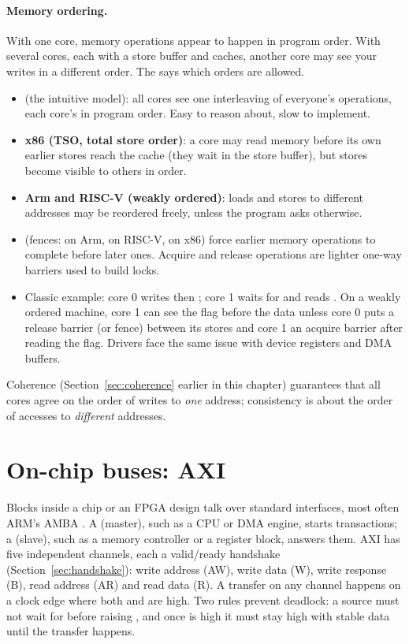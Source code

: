 \paragraph{Memory ordering.} With one core, memory operations appear to happen in program order. With several cores, each with a store buffer and caches, another core may see your writes in a different order. The  says which orders are allowed.
\begin{itemize}
  \item {} (the intuitive model): all cores see one interleaving of everyone's operations, each core's in program order. Easy to reason about, slow to implement.
  \item \textbf{x86 (TSO, total store order)}: a core may read memory before its own earlier stores reach the cache (they wait in the store buffer), but stores become visible to others in order.
  \item \textbf{Arm and RISC-V (weakly ordered)}: loads and stores to different addresses may be reordered freely, unless the program asks otherwise.
  \item {} (fences:  on Arm,  on RISC-V,  on x86) force earlier memory operations to complete before later ones. Acquire and release operations are lighter one-way barriers used to build locks.
  \item Classic example: core 0 writes  then ; core 1 waits for  and reads . On a weakly ordered machine, core 1 can see the flag before the data unless core 0 puts a release barrier (or fence) between its stores and core 1 an acquire barrier after reading the flag. Drivers face the same issue with device registers and DMA buffers.
\end{itemize}

Coherence (Section~\ref{sec:coherence} earlier in this chapter) guarantees that all cores agree on the order of writes to \emph{one} address; consistency is about the order of accesses to \emph{different} addresses.

\section{On-chip buses: AXI}
\label{sec:axi}

Blocks inside a chip or an FPGA design talk over standard interfaces, most often ARM's AMBA . A  (master), such as a CPU or DMA engine, starts transactions; a  (slave), such as a memory controller or a register block, answers them. AXI has five independent channels, each a valid/ready handshake (Section~\ref{sec:handshake}): write address (AW), write data (W), write response (B), read address (AR) and read data (R). A transfer on any channel happens on a clock edge where both  and  are high. Two rules prevent deadlock: a source must not wait for  before raising , and once  is high it must stay high with stable data until the transfer happens.

